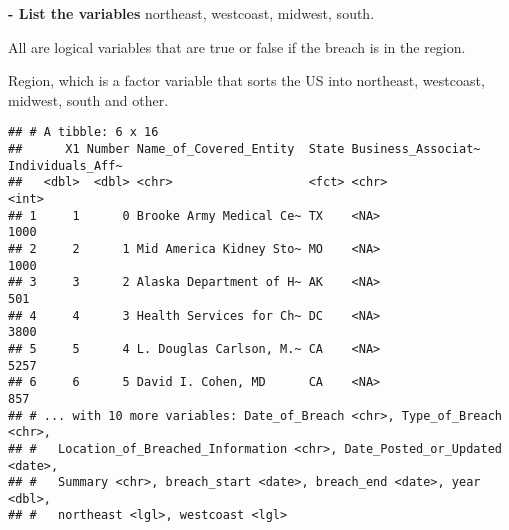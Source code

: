 \documentclass[
]{article}
\newenvironment{Shaded}{\begin{snugshade}}{\end{snugshade}}
\newcommand{\CommentTok}[1]{\textcolor[rgb]{0.56,0.35,0.01}{\textit{#1}}}
\newcommand{\ConstantTok}[1]{\textcolor[rgb]{0.00,0.00,0.00}{#1}}
\newcommand{\ControlFlowTok}[1]{\textcolor[rgb]{0.13,0.29,0.53}{\textbf{#1}}}
\newcommand{\FunctionTok}[1]{\textcolor[rgb]{0.00,0.00,0.00}{#1}}
\newcommand{\NormalTok}[1]{#1}
\newcommand{\OtherTok}[1]{\textcolor[rgb]{0.56,0.35,0.01}{#1}}
\newcommand{\SpecialCharTok}[1]{\textcolor[rgb]{0.00,0.00,0.00}{#1}}
\newcommand{\StringTok}[1]{\textcolor[rgb]{0.31,0.60,0.02}{#1}}
\begin{document}
\textbf{- List the variables} northeast, westcoast, midwest, south.

All are logical variables that are true or false if the breach is in the
region.

Region, which is a factor variable that sorts the US into northeast,
westcoast, midwest, south and other.

\begin{Shaded}
\end{Shaded}

\begin{verbatim}
## # A tibble: 6 x 16
##      X1 Number Name_of_Covered_Entity  State Business_Associat~ Individuals_Aff~
##   <dbl>  <dbl> <chr>                   <fct> <chr>                         <int>
## 1     1      0 Brooke Army Medical Ce~ TX    <NA>                           1000
## 2     2      1 Mid America Kidney Sto~ MO    <NA>                           1000
## 3     3      2 Alaska Department of H~ AK    <NA>                            501
## 4     4      3 Health Services for Ch~ DC    <NA>                           3800
## 5     5      4 L. Douglas Carlson, M.~ CA    <NA>                           5257
## 6     6      5 David I. Cohen, MD      CA    <NA>                            857
## # ... with 10 more variables: Date_of_Breach <chr>, Type_of_Breach <chr>,
## #   Location_of_Breached_Information <chr>, Date_Posted_or_Updated <date>,
## #   Summary <chr>, breach_start <date>, breach_end <date>, year <dbl>,
## #   northeast <lgl>, westcoast <lgl>
\end{verbatim}
\end{document}
